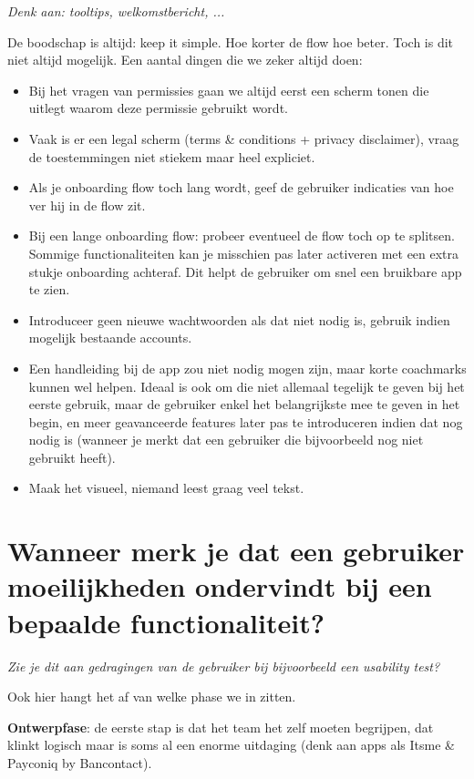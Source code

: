 \textit{Denk aan: tooltips, welkomstbericht, ...}

De boodschap is altijd: keep it simple. Hoe korter de flow hoe beter. Toch is dit niet altijd mogelijk. Een aantal dingen die we zeker altijd doen:
\begin{itemize}
    \item Bij het vragen van permissies gaan we altijd eerst een scherm tonen die uitlegt waarom deze permissie gebruikt wordt.
    \item Vaak is er een legal scherm (terms \& conditions + privacy disclaimer), vraag de toestemmingen niet stiekem maar heel expliciet.
    \item Als je onboarding flow toch lang wordt, geef de gebruiker indicaties van hoe ver hij in de flow zit.
    \item Bij een lange onboarding flow: probeer eventueel de flow toch op te splitsen. Sommige functionaliteiten kan je misschien pas later activeren met een extra stukje onboarding achteraf. Dit helpt de gebruiker om snel een bruikbare app te zien.
    \item Introduceer geen nieuwe wachtwoorden als dat niet nodig is, gebruik indien mogelijk bestaande accounts.
    \item Een handleiding bij de app zou niet nodig mogen zijn, maar korte coachmarks kunnen wel helpen. Ideaal is ook om die niet allemaal tegelijk te geven bij het eerste gebruik, maar de gebruiker enkel het belangrijkste mee te geven in het begin, en meer geavanceerde features later pas te introduceren indien dat nog nodig is (wanneer je merkt dat een gebruiker die bijvoorbeeld nog niet gebruikt heeft).
    \item Maak het visueel, niemand leest graag veel tekst.
\end{itemize}

\section[Vraag 4]{Wanneer merk je dat een gebruiker moeilijkheden ondervindt bij een bepaalde functionaliteit?}

\textit{Zie je dit aan gedragingen van de gebruiker bij bijvoorbeeld een usability test?}

Ook hier hangt het af van welke phase we in zitten.

\textbf{Ontwerpfase}: de eerste stap is dat het team het zelf moeten begrijpen, dat klinkt logisch maar is soms al een enorme uitdaging (denk aan apps als Itsme \& Payconiq by Bancontact).

